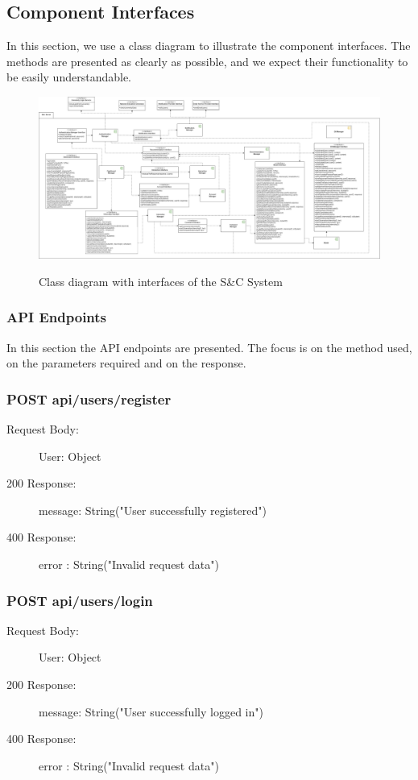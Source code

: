 \documentclass[a4paper,12pt]{article}
\begin{document}
\subsection{Component Interfaces}
In this section, we use a class diagram to illustrate the component interfaces. The methods are presented as clearly as possible, and we expect their functionality to be easily understandable.
\begin{figure}
\centering
\includegraphics[scale = 0.30]{DD_figures/ComponentInterfaces.drawio.png}\\
\caption{Class diagram with interfaces of the S\&C System}
\end{figure}


\newpage
\subsubsection{API Endpoints}
In this section the API endpoints are presented. The focus is on the method used, on the parameters required and on the response.

\subsubsection*{POST api/users/register}
\begin{description}
    \item[Request Body:]  User: Object
    \item[200 Response:] message: String("User successfully registered") 
    \item[400 Response:] error : String("Invalid request data")
\end{description}

\subsubsection*{POST api/users/login}
\begin{description}
    \item[Request Body:]  User: Object
    \item[200 Response:] message: String("User successfully logged in") 
    \item[400 Response:] error : String("Invalid request data")
\end{description}
\end{document}
